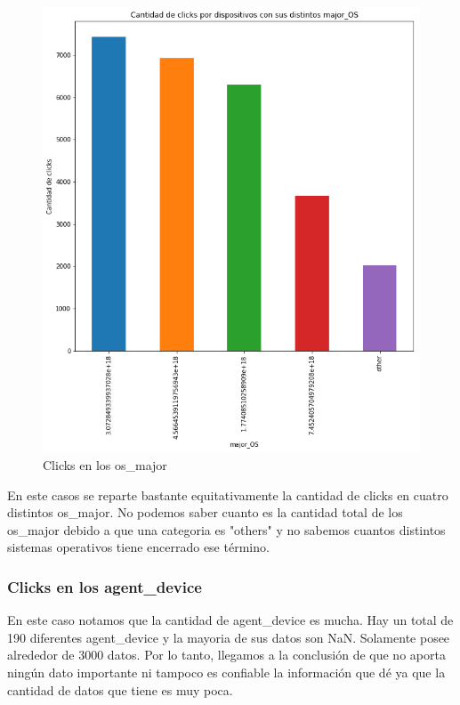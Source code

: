 \documentclass[a4paper, 12pt]{article}
\newcommand\tab[1][1cm]{\hspace*{#1}}
\begin{document}
		\FloatBarrier
		\begin{figure}[h]
			\centering
			\includegraphics[width=\textwidth]{images/clicks/clicks_major_OS.png}
			\caption{Clicks en los os\_major}
		\end{figure}
		\FloatBarrier

		\tab En este casos se reparte bastante equitativamente la cantidad de clicks en cuatro distintos os\_major. No podemos saber cuanto es la cantidad total de los os\_major debido a que una categoria es "others" y no sabemos cuantos distintos sistemas operativos tiene encerrado ese término.

	\subsubsection{Clicks en los agent\_device}
		\tab En este caso notamos que la cantidad de agent\_device es mucha. Hay un total de 190 diferentes agent\_device y la mayoria de sus datos son NaN. Solamente posee alrededor de 3000 datos. Por lo tanto, llegamos a la conclusión de que no aporta ningún dato importante ni tampoco es confiable la información que dé ya que la cantidad de datos que tiene es muy poca.
\end{document}
